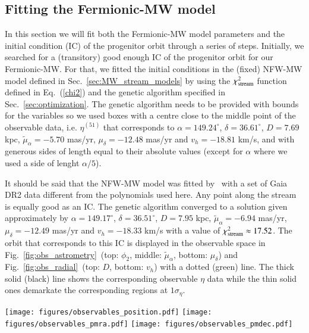 \documentclass[twocolumn]{aa}
\begin{document}
\subsection{Fitting the Fermionic-MW model}
In this section we will fit both the Fermionic-MW model parameters and the initial condition (IC) of the progenitor orbit through a series of steps.
Initially, we searched for a (transitory) good enough IC of the progenitor orbit for our
Fermionic-MW. For that, we fitted the initial conditions in the (fixed) NFW-MW model defined in
Sec.~\ref{sec:MW_stream_models} by using the $\chi^2_{\rm{stream}}$ function defined in Eq.~(\ref{chi2})
and the genetic algorithm specified in Sec.~\ref{sec:optimization}. The genetic algorithm
needs to be provided with bounds for the variables so we used boxes with a centre close to the middle point
of the observable data, i.e. $\eta^{(51)}$ that corresponds to $\alpha=149.24^{\circ}$, $\delta=36.61^{\circ}$, $D=7.69$ kpc, $\tilde{\mu}_\alpha=-5.70$ mas/yr, $\mu_\delta=-12.48$ mas/yr and $v_h=-18.81$ km/s, and with generous sides of length equal to their absolute values (except for $\alpha$ where we used a side of lenght $\alpha/5$).

It should be said that the NFW-MW model was fitted by~\citet{2019MNRAS.486.2995M} with a set of Gaia
DR2 data different from the polynomials used here. Any point along the stream is equally good as an IC. The genetic algorithm converged to a solution given approximately by
$\alpha=149.17^{\circ}$, $\delta=36.51^{\circ}$, $D=7.95$ kpc, $\tilde{\mu}_\alpha=-6.94$ mas/yr, $\mu_\delta=-12.49$ mas/yr and $v_h=-18.33$ km/s with a value of $\chi^2_{\rm{stream}}\approx 17.52$.
The orbit that corresponds to this IC is displayed in the observable space in Fig.~\ref{fig:obs_astrometry}~(top: $\phi_2$, middle: $\tilde{\mu}_\alpha$, bottom: $\mu_\delta$) and Fig.~\ref{fig:obs_radial}~(top: $D$, bottom: $v_h$) with a dotted (green) line. The thick solid (black) line shows the corresponding observable $\eta$ data while the thin solid ones demarkate the corresponding regions at $1\sigma_\eta$.
\begin{figure*}
   \centering
   \texttt{[image: figures/observables\_position.pdf]}
   \texttt{[image: figures/observables\_pmra.pdf]}
   \texttt{[image: figures/observables\_pmdec.pdf]}
   \caption{Stream fits in astrometric observable space: sky position (top: $\phi_2$) and proper motions (middle: $\tilde{\mu}_\alpha$, bottom: $\mu_\delta$).}
   \label{fig:obs_astrometry}
\end{figure*}
\end{document}
